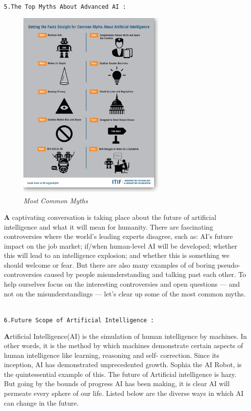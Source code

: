 \documentclass{article}
\begin{document}
\begin{large}
\texttt{5.The Top Myths About Advanced AI :}
\end{large}
\begin{figure}
\centering
\includegraphics[width=2.9in]{Myth}

\caption{\textit{Most Common Myths}}
\end{figure}

\textbf{\Huge A} captivating conversation is taking place about the future of artificial intelligence and what it will mean for humanity. There are fascinating controversies where the world’s leading experts disagree,
 such as: AI’s future impact on the job market; if/when human-level AI will be developed; whether this will lead to an intelligence explosion; and whether this is something we should welcome or fear. But there are also many examples of of boring pseudo-controversies caused by people misunderstanding and talking past each other. To help ourselves focus on the interesting controversies and open questions — and not on the misunderstandings — let’s  clear up some of the most common myths.\\\\
 
 \begin{large}
 \texttt{6.Future Scope of Artificial Intelligence :}
 \end{large}
 
\textbf{\Huge A}rtificial Intelligence(AI) is the simulation of human intelligence by machines. In other words, it is the method by which machines demonstrate certain aspects of human intelligence like learning, reasoning and self- correction. Since its inception, AI has demonstrated unprecedented growth. Sophia the AI Robot, is the quintessential example of this. The future of Artificial intelligence is hazy. But going by the bounds of progress AI has been making, it is clear AI will permeate every sphere of our life. Listed below are the diverse ways in which AI can change in the future.\\
 
\end{document}
